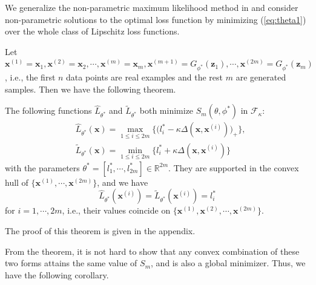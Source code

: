 We generalize the non-parametric maximum likelihood method in \cite{carando2009nonparametric} and consider non-parametric solutions to the optimal loss function by minimizing (\ref{eq:theta1}) over the whole class of Lipschitz loss functions.


Let $\mathbf x^{(1)}=\mathbf x_1, \mathbf x^{(2)}=\mathbf x_2, \cdots,\mathbf x^{(m)}=\mathbf x_m, \mathbf x^{(m+1)}=G_{\phi^*}(\mathbf z_1),\cdots,\mathbf x^{(2m)}=G_{\phi^*}(\mathbf z_m)$, i.e., the first $n$ data points are real examples and the rest $m$ are generated samples.  Then we have the following theorem.
\begin{theorem}\label{thm_nonparam}
The following functions $\widehat L_{\theta^*}$ and $\widetilde L_{\theta^*}$ both minimize $S_{m}(\theta,\phi^*)$ in $\mathcal F_\kappa$:
\begin{equation}\label{eq:param}
\begin{aligned}
&\widehat L_{\theta^*}(\mathbf x) = \max_{1\leq i\leq 2m}\big\{\big(l_i^*-\kappa\Delta(\mathbf x,\mathbf x^{(i)})\big)_+\big\}, \\
&\widetilde L_{\theta^*}(\mathbf x) = \min_{1\leq i\leq 2m}\big\{l_i^*+\kappa\Delta(\mathbf x,\mathbf x^{(i)})\}
\end{aligned}
\end{equation}
with the parameters $\theta^*=[l_1^*,\cdots,l_{2m}^*]\in\mathbb R^{2m}$. They are supported in the convex hull of $\{\mathbf x^{(1)}, \cdots, \mathbf x^{(2m)}\}$, and we have
$$\widehat L_{\theta^*}(\mathbf x^{(i)})=\widetilde L_{\theta^*}(\mathbf x^{(i)})=l_i^*$$
for $i=1,\cdots,2m$, i.e., their values coincide on $\{\mathbf x^{(1)},\mathbf x^{(2)},\cdots,\mathbf x^{(2m)}\}$.
\end{theorem}
The proof of this theorem is given in the appendix.

From the theorem, it is not hard to show that any convex combination of these two forms attains the same value of $S_{m}$, and is also a global minimizer.  Thus, we have the following corollary.

